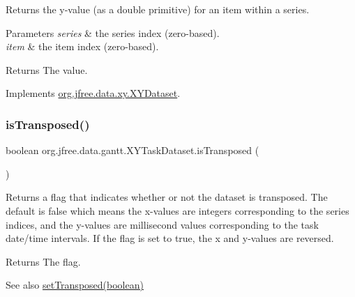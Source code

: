 Returns the y-\/value (as a double primitive) for an item within a series.


\begin{DoxyParams}{Parameters}
{\em series} & the series index (zero-\/based). \\
\hline
{\em item} & the item index (zero-\/based).\\
\hline
\end{DoxyParams}
\begin{DoxyReturn}{Returns}
The value. 
\end{DoxyReturn}


Implements \mbox{\hyperlink{interfaceorg_1_1jfree_1_1data_1_1xy_1_1_x_y_dataset_a5e86389417eb5ed7b663a952ca370914}{org.\+jfree.\+data.\+xy.\+X\+Y\+Dataset}}.

\mbox{\label{classorg_1_1jfree_1_1data_1_1gantt_1_1_x_y_task_dataset_ab3ff49031eb07439efcdb9b14d470cb3}} 
\subsubsection{\texorpdfstring{is\+Transposed()}{isTransposed()}}
{\footnotesize\ttfamily boolean org.\+jfree.\+data.\+gantt.\+X\+Y\+Task\+Dataset.\+is\+Transposed (\begin{DoxyParamCaption}{ }\end{DoxyParamCaption})}

Returns a flag that indicates whether or not the dataset is transposed. The default is {\ttfamily false} which means the x-\/values are integers corresponding to the series indices, and the y-\/values are millisecond values corresponding to the task date/time intervals. If the flag is set to {\ttfamily true}, the x and y-\/values are reversed.

\begin{DoxyReturn}{Returns}
The flag.
\end{DoxyReturn}
\begin{DoxySeeAlso}{See also}
\mbox{\hyperlink{classorg_1_1jfree_1_1data_1_1gantt_1_1_x_y_task_dataset_ac784b2fb23128cc85b9d4c14dd762d3a}{set\+Transposed(boolean)}} 
\end{DoxySeeAlso}
\mbox{\label{classorg_1_1jfree_1_1data_1_1gantt_1_1_x_y_task_dataset_a8d2f868d7f2cba834f06f2e54131ede4}} 
